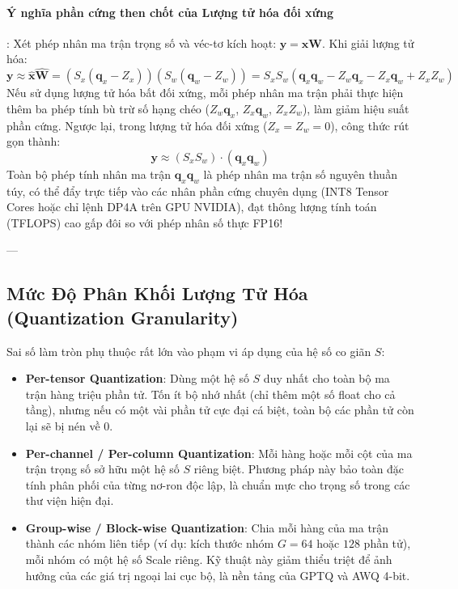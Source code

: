 \paragraph{Ý nghĩa phần cứng then chốt của Lượng tử hóa đối xứng}:
Xét phép nhân ma trận trọng số và véc-tơ kích hoạt: $\mathbf{y} = \mathbf{x} \mathbf{W}$. Khi giải lượng tử hóa:
\begin{equation}
\mathbf{y} \approx \hat{\mathbf{x}} \hat{\mathbf{W}} = (S_x (\mathbf{q}_x - Z_x)) (S_w (\mathbf{q}_w - Z_w)) = S_x S_w \left( \mathbf{q}_x \mathbf{q}_w - Z_w \mathbf{q}_x - Z_x \mathbf{q}_w + Z_x Z_w \right)
\end{equation}
Nếu sử dụng lượng tử hóa bất đối xứng, mỗi phép nhân ma trận phải thực hiện thêm ba phép tính bù trừ số hạng chéo ($Z_w \mathbf{q}_x$, $Z_x \mathbf{q}_w$, $Z_x Z_w$), làm giảm hiệu suất phần cứng. Ngược lại, trong lượng tử hóa đối xứng ($Z_x = Z_w = 0$), công thức rút gọn thành:
\begin{equation}
\mathbf{y} \approx (S_x S_w) \cdot (\mathbf{q}_x \mathbf{q}_w)
\end{equation}
Toàn bộ phép tính nhân ma trận $\mathbf{q}_x \mathbf{q}_w$ là phép nhân ma trận số nguyên thuần túy, có thể đẩy trực tiếp vào các nhân phần cứng chuyên dụng (INT8 Tensor Cores hoặc chỉ lệnh DP4A trên GPU NVIDIA), đạt thông lượng tính toán (TFLOPS) cao gấp đôi so với phép nhân số thực FP16!

---

\subsection{Mức Độ Phân Khối Lượng Tử Hóa (Quantization Granularity)}
Sai số làm tròn phụ thuộc rất lớn vào phạm vi áp dụng của hệ số co giãn $S$:
\begin{itemize}
  \item \textbf{Per-tensor Quantization}: Dùng một hệ số $S$ duy nhất cho toàn bộ ma trận hàng triệu phần tử. Tốn ít bộ nhớ nhất (chỉ thêm một số float cho cả tầng), nhưng nếu có một vài phần tử cực đại cá biệt, toàn bộ các phần tử còn lại sẽ bị nén về $0$.
  \item \textbf{Per-channel / Per-column Quantization}: Mỗi hàng hoặc mỗi cột của ma trận trọng số sở hữu một hệ số $S$ riêng biệt. Phương pháp này bảo toàn đặc tính phân phối của từng nơ-ron độc lập, là chuẩn mực cho trọng số trong các thư viện hiện đại.
  \item \textbf{Group-wise / Block-wise Quantization}: Chia mỗi hàng của ma trận thành các nhóm liên tiếp (ví dụ: kích thước nhóm $G = 64$ hoặc $128$ phần tử), mỗi nhóm có một hệ số Scale riêng. Kỹ thuật này giảm thiểu triệt để ảnh hưởng của các giá trị ngoại lai cục bộ, là nền tảng của GPTQ và AWQ 4-bit.
\end{itemize}

